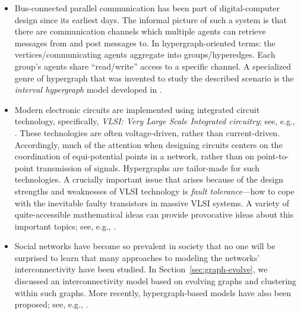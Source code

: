 \begin{itemize}
\item
Bus-connected parallel communication has been part of digital-computer design since
its earliest days.  The informal picture of such a system is that there are communication 
channels which multiple agents can retrieve messages from and post messages to.  In
hypergraph-oriented terms: the vertices/communicating agents aggregate into 
groups/hyperedges.  Each group's agents share ``read/write'' access to a specific channel.  A
specialized genre of hypergraph that was invented to study the described scenario is the 
{\it interval hypergraph}  model developed in \cite{Rosenberg89a}.

\item
Modern electronic circuits are implemented using integrated circuit technology,
specifically, {\em VLSI: Very Large Scale Integrated circuitry}; see,
e.g., \cite{Mead-Conway}.  These technologies are often voltage-driven, rather than 
current-driven.  Accordingly, much of the attention when designing circuits centers on 
the coordination of equi-potential points in a network, rather than on point-to-point
transmission of signals.  Hypergraphs are tailor-made for such technologies.  A crucially 
important issue that arises because of the design strengths and weaknesses of VLSI 
technology is {\it fault tolerance}---how to cope with the inevitable faulty transistors in
massive VLSI systems.  A variety of quite-accessible mathematical ideas can
provide provocative ideas about this important topics; see, e.g., \cite{Rosenberg85a}.

\item
Social networks have become so prevalent in society that no one will be surprised to 
learn that many approaches to modeling the networks' interconnectivity have been studied.  In
Section~\ref{sec:graph-evolve}, we discussed an interconnectivity model based on evolving
graphs and clustering within such graphs.  More recently, hypergraph-based models
have also been proposed; see, e.g., \cite{Amatoetal17,LiuBV10}.
\end{itemize}





